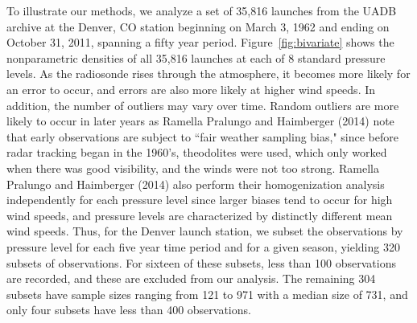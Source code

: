 \documentclass[12pt]{article}
\begin{document}
\begin{doublespacing}
 To illustrate our methods, we analyze  a set of 35,816 launches from the UADB archive at the Denver, CO station beginning on March 3, 1962 and ending on October 31, 2011, spanning a fifty year period.  Figure~\ref{fig:bivariate} shows the nonparametric densities of all 35,816 launches at each of 8 standard pressure levels.  As the radiosonde rises through the atmosphere, it becomes more likely for an error to occur, and errors are also more likely at higher wind speeds.  In addition,  the number of outliers may vary over time.  Random outliers are more likely to occur in later years as Ramella Pralungo and Haimberger (2014) note that early observations are subject to ``fair weather sampling bias," since before  radar tracking began in the 1960's, theodolites were used, which only worked when there was   good visibility, and the winds were not too strong.   Ramella Pralungo and Haimberger (2014)  also  perform their homogenization analysis independently for each pressure level since larger biases tend to occur for high wind speeds, and pressure levels are characterized by distinctly different mean wind speeds.   Thus, for the Denver launch station, we subset the observations by  pressure level for each  five year time period and for a given season, yielding 320 subsets of observations.  For sixteen of these subsets, less than 100 observations are recorded, and these are excluded from our analysis.  The remaining 304 subsets have sample sizes ranging from 121 to 971 with a median size of 731, and only four subsets have less than 400 observations.
 

\end{doublespacing}
\end{document}
